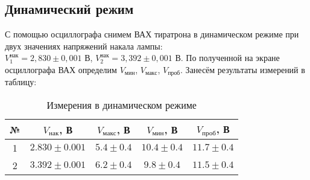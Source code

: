 \subsection{Динамический режим}
С помощью осциллографа снимем ВАХ тиратрона в динамическом режиме при двух
значениях напряжений накала лампы: \\$V_1^{нак} = 2,830\pm 0,001$ В, $V_2^{нак} = 3,392 \pm 0,001$ В.
По полученной на экране осциллографа ВАХ определим $V_{мин}$, $V_{макс}$, 
$V_{проб}$. Занесём результаты измерений в таблицу:

\begin{table}[h!]
  \centering
  \caption{Измерения в динамическом режиме}
  \begin{tabular}{|c|c|c|c|c|}
    \hline
    № & $V_{нак}$, В & $V_{макс}$, В & $V_{мин}$, В & $V_{проб}$, В \\ 
    \hline
    1 & $2.830 \pm 0.001$ & $ 5.4 \pm 0.4$ & $ 10.4 \pm 0.4$ & $11.7 \pm 0.4$ \\ \hline
    2 & $3.392 \pm 0.001$ & $6.2 \pm 0.4$   & $ 9.8 \pm 0.4$    &  $ 11.5 \pm 0.4$ \\ 
    \hline
  \end{tabular}
\end{table}


